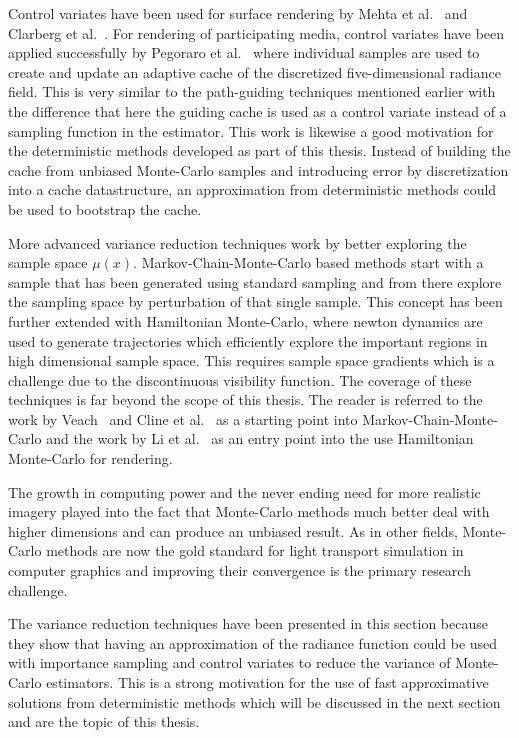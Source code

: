 Control variates have been used for surface rendering by Mehta et al.~\cite{Mehta12} and Clarberg et al.~\cite{Clarberg08}. For rendering of participating media, control variates have been applied successfully by Pegoraro et al.~\cite{Pegoraro08} where individual samples are used to create and update an adaptive cache of the discretized five-dimensional radiance field. This is very similar to the path-guiding techniques mentioned earlier with the difference that here the guiding cache is used as a control variate instead of a sampling function in the estimator. This work is likewise a good motivation for the deterministic methods developed as part of this thesis. Instead of building the cache from unbiased Monte-Carlo samples and introducing error by discretization into a cache datastructure, an approximation from deterministic methods could be used to bootstrap the cache.

More advanced variance reduction techniques work by better exploring the sample space $\mu\left(x\right)$. Markov-Chain-Monte-Carlo based methods start with a sample that has been generated using standard sampling and from there explore the sampling space by perturbation of that single sample. This concept has been further extended with Hamiltonian Monte-Carlo, where newton dynamics are used to generate trajectories which efficiently explore the important regions in high dimensional sample space. This requires sample space gradients which is a challenge due to the discontinuous visibility function. The coverage of these techniques is far beyond the scope of this thesis. The reader is referred to the work by Veach~\cite{VeachThesis97} and Cline et al.~\cite{Cline05, Cline05apractical} as a starting point into Markov-Chain-Monte-Carlo and the work by Li et al.~\cite{Li15} as an entry point into the use Hamiltonian Monte-Carlo for rendering.

The growth in computing power and the never ending need for more realistic imagery played into the fact that Monte-Carlo methods much better deal with higher dimensions and can produce an unbiased result. As in other fields, Monte-Carlo methods are now the gold standard for light transport simulation in computer graphics and improving their convergence is the primary research challenge.

The variance reduction techniques have been presented in this section because they show that having an approximation of the radiance function could be used with importance sampling and control variates to reduce the variance of Monte-Carlo estimators. This is a strong motivation for the use of fast approximative solutions from deterministic methods which will be discussed in the next section and are the topic of this thesis.


